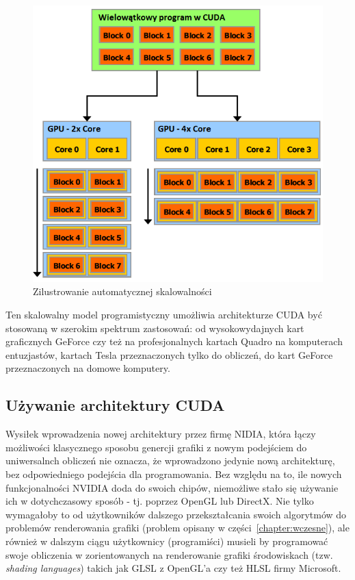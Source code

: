 \begin{figure}[h]
\centering\includegraphics[width=1.0\textwidth]{figures/03/threads_gpu.png}
\caption{Zilustrowanie automatycznej skalowalności~\cite{Cuda:PGuide}}\label{rys:threads_gpu}
\end{figure}

Ten skalowalny model programistyczny umożliwia architekturze CUDA być stosowaną w szerokim spektrum zastosowań: od wysokowydajnych kart graficznych GeForce czy też na profesjonalnych kartach Quadro na komputerach entuzjastów, kartach Tesla przeznaczonych tylko do obliczeń, do kart GeForce przeznaczonych na domowe komputery.

\subsection{Używanie architektury CUDA}

Wysiłek wprowadzenia nowej architektury przez firmę NIDIA, która łączy możliwości klasycznego sposobu genercji grafiki z nowym podejściem do uniwersalnch obliczeń nie oznacza, że wprowadzono jedynie nową architekturę, bez odpowiedniego podejścia dla programowania. Bez względu na to, ile nowych funkcjonalności NVIDIA doda do swoich chipów, niemożliwe stało się używanie ich w dotychczasowy sposób - tj. poprzez OpenGL lub DirectX. Nie tylko wymagałoby to od użytkowników dalszego przekształcania swoich algorytmów do problemów renderowania grafiki (problem opisany w części~\ref{chapter:wczesne}), ale również w dalszym ciągu użytkownicy (programiści) musieli by programować swoje obliczenia w zorientowanych na renderowanie grafiki środowiskach (tzw. \emph{shading languages}) takich jak GLSL z OpenGL'a czy też HLSL firmy Microsoft.


